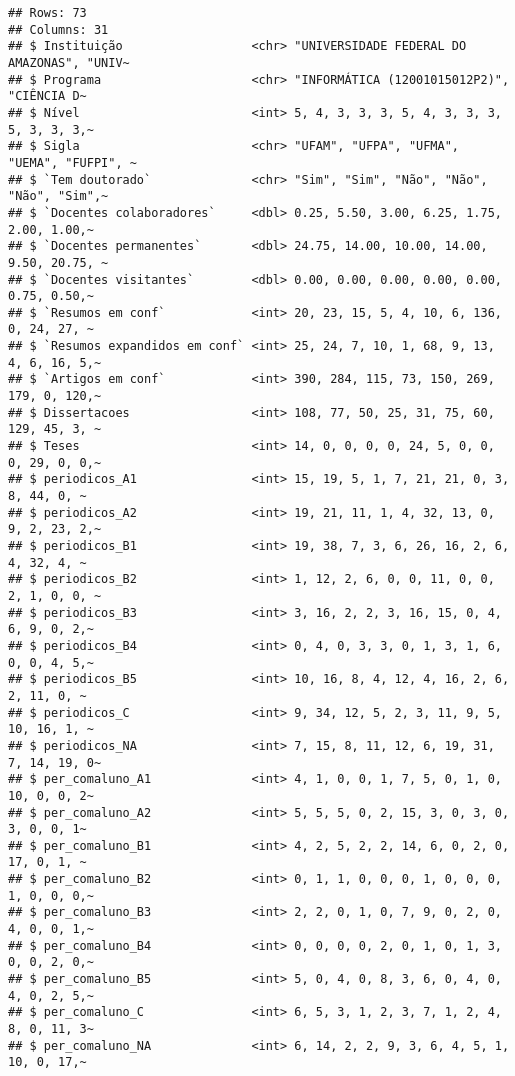 \documentclass[
]{article}
\begin{document}
\begin{verbatim}
## Rows: 73
## Columns: 31
## $ Instituição                  <chr> "UNIVERSIDADE FEDERAL DO AMAZONAS", "UNIV~
## $ Programa                     <chr> "INFORMÁTICA (12001015012P2)", "CIÊNCIA D~
## $ Nível                        <int> 5, 4, 3, 3, 3, 5, 4, 3, 3, 3, 5, 3, 3, 3,~
## $ Sigla                        <chr> "UFAM", "UFPA", "UFMA", "UEMA", "FUFPI", ~
## $ `Tem doutorado`              <chr> "Sim", "Sim", "Não", "Não", "Não", "Sim",~
## $ `Docentes colaboradores`     <dbl> 0.25, 5.50, 3.00, 6.25, 1.75, 2.00, 1.00,~
## $ `Docentes permanentes`       <dbl> 24.75, 14.00, 10.00, 14.00, 9.50, 20.75, ~
## $ `Docentes visitantes`        <dbl> 0.00, 0.00, 0.00, 0.00, 0.00, 0.75, 0.50,~
## $ `Resumos em conf`            <int> 20, 23, 15, 5, 4, 10, 6, 136, 0, 24, 27, ~
## $ `Resumos expandidos em conf` <int> 25, 24, 7, 10, 1, 68, 9, 13, 4, 6, 16, 5,~
## $ `Artigos em conf`            <int> 390, 284, 115, 73, 150, 269, 179, 0, 120,~
## $ Dissertacoes                 <int> 108, 77, 50, 25, 31, 75, 60, 129, 45, 3, ~
## $ Teses                        <int> 14, 0, 0, 0, 0, 24, 5, 0, 0, 0, 29, 0, 0,~
## $ periodicos_A1                <int> 15, 19, 5, 1, 7, 21, 21, 0, 3, 8, 44, 0, ~
## $ periodicos_A2                <int> 19, 21, 11, 1, 4, 32, 13, 0, 9, 2, 23, 2,~
## $ periodicos_B1                <int> 19, 38, 7, 3, 6, 26, 16, 2, 6, 4, 32, 4, ~
## $ periodicos_B2                <int> 1, 12, 2, 6, 0, 0, 11, 0, 0, 2, 1, 0, 0, ~
## $ periodicos_B3                <int> 3, 16, 2, 2, 3, 16, 15, 0, 4, 6, 9, 0, 2,~
## $ periodicos_B4                <int> 0, 4, 0, 3, 3, 0, 1, 3, 1, 6, 0, 0, 4, 5,~
## $ periodicos_B5                <int> 10, 16, 8, 4, 12, 4, 16, 2, 6, 2, 11, 0, ~
## $ periodicos_C                 <int> 9, 34, 12, 5, 2, 3, 11, 9, 5, 10, 16, 1, ~
## $ periodicos_NA                <int> 7, 15, 8, 11, 12, 6, 19, 31, 7, 14, 19, 0~
## $ per_comaluno_A1              <int> 4, 1, 0, 0, 1, 7, 5, 0, 1, 0, 10, 0, 0, 2~
## $ per_comaluno_A2              <int> 5, 5, 5, 0, 2, 15, 3, 0, 3, 0, 3, 0, 0, 1~
## $ per_comaluno_B1              <int> 4, 2, 5, 2, 2, 14, 6, 0, 2, 0, 17, 0, 1, ~
## $ per_comaluno_B2              <int> 0, 1, 1, 0, 0, 0, 1, 0, 0, 0, 1, 0, 0, 0,~
## $ per_comaluno_B3              <int> 2, 2, 0, 1, 0, 7, 9, 0, 2, 0, 4, 0, 0, 1,~
## $ per_comaluno_B4              <int> 0, 0, 0, 0, 2, 0, 1, 0, 1, 3, 0, 0, 2, 0,~
## $ per_comaluno_B5              <int> 5, 0, 4, 0, 8, 3, 6, 0, 4, 0, 4, 0, 2, 5,~
## $ per_comaluno_C               <int> 6, 5, 3, 1, 2, 3, 7, 1, 2, 4, 8, 0, 11, 3~
## $ per_comaluno_NA              <int> 6, 14, 2, 2, 9, 3, 6, 4, 5, 1, 10, 0, 17,~
\end{verbatim}
\end{document}
